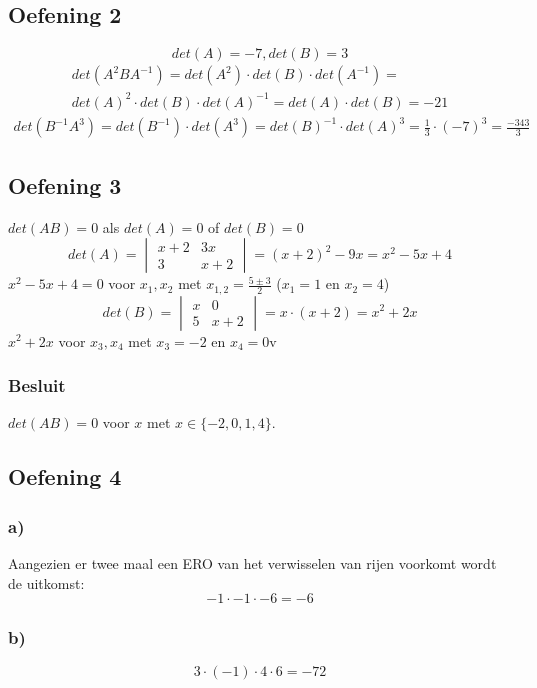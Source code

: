 \documentclass[lineaire_algebra_oplossingen.tex]{subfiles}
\begin{document}
\subsection{Oefening 2}
\[det(A) = -7, det(B) = 3\]
\begin{gather*}
    det(A^2BA^{-1}) =
    det(A^2) \cdot det(B) \cdot det(A^{-1}) =\\
    det(A)^2 \cdot det(B) \cdot det(A)^{-1} = det(A) \cdot det(B) = -21
\end{gather*}
\begin{gather*}
    det(B^{-1}A^3) = det(B^{-1}) \cdot det(A^3) = det(B)^{-1} \cdot det(A)^3 = \frac{1}{3} \cdot (-7)^3 = \frac{-343}{3}
\end{gather*}

\subsection{Oefening 3}
$det(AB) = 0$ als $det(A) = 0$ of $det(B) = 0$
\\
\[det(A) = \begin{vmatrix}
x + 2 & 3x\\
3 & x + 2
\end{vmatrix}
 = (x + 2)^2 - 9x = x^2 -5 x + 4
\]
$x^2 -5 x + 4 = 0$ voor $x_1, x_2$ met $x_{1,2} = \frac{5 \pm 3}{2}$ ($x_1 = 1$ en $x_2 = 4$)
\\
\[det(B) = \begin{vmatrix}
x & 0\\
5 & x + 2
\end{vmatrix}
 = x \cdot (x + 2) = x^2 + 2x\]
$x^2 + 2x$ voor $x_3, x_4$ met $x_3 = -2$ en $x_4 = 0$v 
\subsubsection*{Besluit}
$det(AB) = 0$ voor $x$ met $x \in \{-2, 0, 1, 4\}$.
\subsection{Oefening 4}
\subsubsection*{a)}
Aangezien er twee maal een ERO van het verwisselen van rijen voorkomt wordt de uitkomst:
$$-1\cdot -1\cdot -6 = -6$$
\subsubsection*{b)}
$$3\cdot(-1)\cdot 4 \cdot 6 = -72$$
\end{document}
